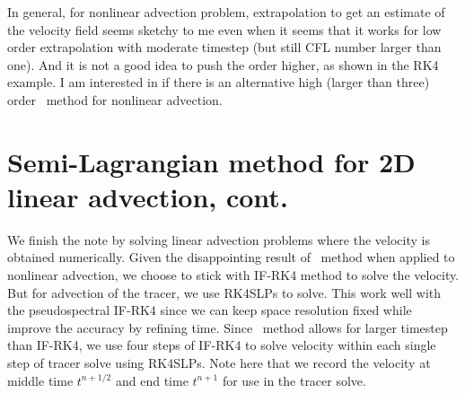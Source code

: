 \documentclass[11pt,letterpaper]{article}
\begin{document}
In general, for nonlinear advection problem, extrapolation to get an estimate of the velocity field seems sketchy to me even when it seems that it works for low order extrapolation with moderate timestep (but still CFL number larger than one). And it is not a good idea to push the order higher, as shown in the RK4 example. I am interested in if there is an alternative high (larger than three) order \sml\ method for nonlinear advection. 

\section{Semi-Lagrangian method for 2D linear advection, cont.}\label{sec:adv_NS}
We finish the note by solving linear advection problems where the velocity is obtained numerically. Given the disappointing result of \sml\ method when applied to nonlinear advection, we choose to stick with IF-RK4 method to solve the velocity. But for advection of the tracer, we use RK4SLPs to solve. This work well with the pseudospectral IF-RK4 since we can keep space resolution fixed while improve the accuracy by refining time. Since \sml\ method allows for larger timestep than IF-RK4, we use four steps of IF-RK4 to solve velocity within each single step of tracer solve using RK4SLPs. Note here that we record the velocity at middle time $t^{n+1/2}$ and end time $t^{n+1}$ for use in the tracer solve.
\end{document}
